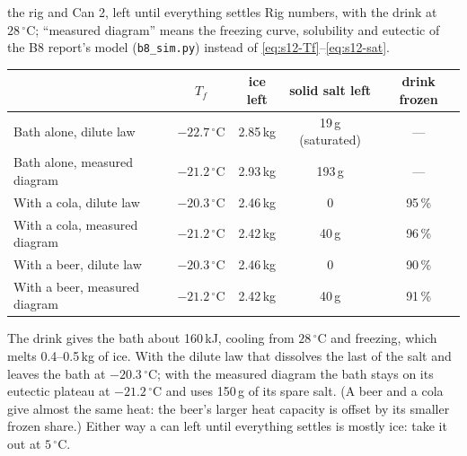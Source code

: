 \documentclass[11pt,a4paper]{article}
\newcommand{\dC}{\,{}^{\circ}\mathrm{C}}
\begin{document}
\begin{worked}{the rig and Can 2, left until everything settles}
Rig numbers, with the drink at $28\dC$; ``measured diagram'' means the freezing curve, solubility and eutectic
of the B8 report's model (\texttt{b8\_sim.py}) instead of \eqref{eq:s12-Tf}--\eqref{eq:s12-sat}.

\begin{center}\small
\begin{tabular}{@{}lcccc@{}}
\toprule
 & $T_f$ & ice left & solid salt left & drink frozen\\
\midrule
Bath alone, dilute law & $-22.7\dC$ & 2.85\,kg & 19\,g (saturated) & ---\\
Bath alone, measured diagram & $-21.2\dC$ & 2.93\,kg & 193\,g & ---\\
With a cola, dilute law & $-20.3\dC$ & 2.46\,kg & 0 & 95\,\%\\
With a cola, measured diagram & $-21.2\dC$ & 2.42\,kg & 40\,g & 96\,\%\\
With a beer, dilute law & $-20.3\dC$ & 2.46\,kg & 0 & 90\,\%\\
With a beer, measured diagram & $-21.2\dC$ & 2.42\,kg & 40\,g & 91\,\%\\
\bottomrule
\end{tabular}
\end{center}

\smallskip
The drink gives the bath about 160\,kJ, cooling from $28\dC$ and freezing, which melts 0.4--0.5\,kg of ice.
With the dilute law that dissolves the last of the salt and leaves the bath at $-20.3\dC$; with the measured
diagram the bath stays on its eutectic plateau at $-21.2\dC$ and uses 150\,g of its spare salt. (A beer and a
cola give almost the same heat: the beer's larger heat capacity is offset by its smaller frozen share.) Either
way a can left until everything settles is mostly ice: take it out at $5\dC$.
\end{worked}
\end{document}
